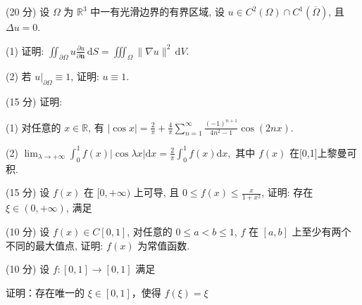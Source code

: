 (20 分) 设 $\Omega$ 为 $\mathbb{R}^3$ 中一有光滑边界的有界区域, 设 $u \in C^2(\Omega) \cap C^1(\overline{\Omega})$, 且 $\Delta u = 0$.\par
(1) 证明: $\iint_{\partial \Omega} u \frac{\partial u}{\partial \pmb{n}} \, \mathrm{d}S = \iiint_{\Omega} \| \nabla u \|^{2} \, \mathrm{d}V.$\par
(2) 若 $u|_{\partial \Omega} \equiv 1$, 证明: $u \equiv 1$.\par
\par{}
(15 分) 证明:\par
(1) 对任意的 $x \in \mathbb{R}$, 有 $|\cos x| = \frac{2}{\pi} + \frac{4}{\pi} \sum_{n=1}^{\infty} \frac{(-1)^{n+1}}{4n^2 - 1} \cos(2nx)$.\par
(2) $\lim_{\lambda \to +\infty}\int_0^1 f(x)|\cos \lambda x|\mathrm{d}x = \frac{2}{\pi}\int_0^1 f(x)\mathrm{d}x,$ 其中 $f(x)$ 在[0,1]上黎曼可积.\par
\par{}
\par{}
(15 分) 设 $f(x)$ 在 $[0, +\infty)$ 上可导, 且 $0 \leq f(x) \leq \frac{x}{1 + x^2}$, 证明: 存在 $\xi \in (0, +\infty)$, 满足\par
\nopagebreak[4]
\par{}
(10 分) 设 $f(x) \in C[0,1]$, 对任意的 $0 \leq a < b \leq 1$, $f$ 在 $[a,b]$ 上至少有两个不同的最大值点, 证明: $f(x)$ 为常值函数.\par
\par{}
\par{}
(10 分) 设 $f: [0,1] \to [0,1]$ 满足\par
\nopagebreak[4]
证明：存在唯一的 $\xi \in [0,1]$，使得 $f(\xi) = \xi$\par
